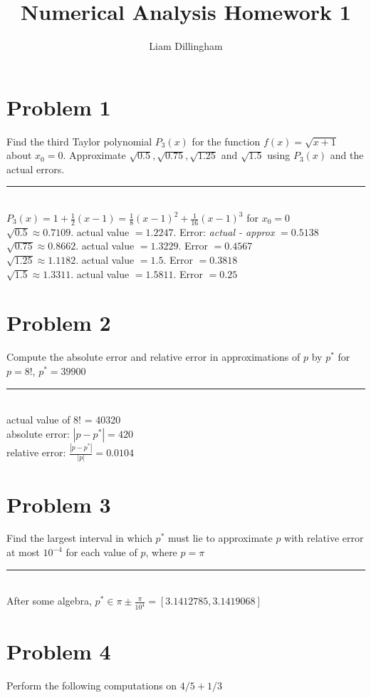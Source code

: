 \documentclass[20pt]{article} %
\title{Numerical Analysis Homework 1}
\author{Liam Dillingham}
\begin{document}
\maketitle

\section{Problem 1}
Find the third Taylor polynomial $P_3(x)$ for the function $f(x) = \sqrt{x+1}$ about $x_0 = 0$. Approximate $\sqrt{0.5}, \sqrt{0.75}, \sqrt{1.25}$ and $\sqrt{1.5}$ using $P_3(x)$ and the actual errors.\\
\noindent\rule{2cm}{0.4pt} \\
$P_3(x) = 1 + \frac{1}{2}(x-1) = \frac{1}{8}(x-1)^2 + \frac{1}{16}(x-1)^3$ for $x_0 = 0$\\
$\sqrt{0.5} \approx 0.7109$. actual value $= 1.2247$. Error: \textit{actual - approx} $= 0.5138 $\\
$\sqrt{0.75} \approx 0.8662$. actual value $= 1.3229$. Error $= 0.4567 $\\
$\sqrt{1.25} \approx 1.1182$. actual value $= 1.5$. Error $= 0.3818$\\
$\sqrt{1.5} \approx 1.3311$. actual value $=1.5811 $. Error $= 0.25$\\

\section{Problem 2}
Compute the absolute error and relative error in approximations of $p$ by $p^*$ for $p = 8!$, $p^* = 39900$\\
\noindent\rule{2cm}{0.4pt} \\
actual value of 8! = 40320\\
absolute error: $|p - p^*| = 420$\\
relative error: $\frac{|p - p^*|}{|p|} = 0.0104$

\section{Problem 3}
Find the largest interval in which $p^*$ must lie to approximate $p$ with relative error at most $10^{-4}$ for each value of $p$, where $p = \pi$\\
\noindent\rule{2cm}{0.4pt} \\
After some algebra, $p^* \in \pi \pm \frac{\pi}{10^4} = [3.1412785,3.1419068 ]$

\section{Problem 4}
Perform the following computations on $4/5 + 1/3$
\end{document}
